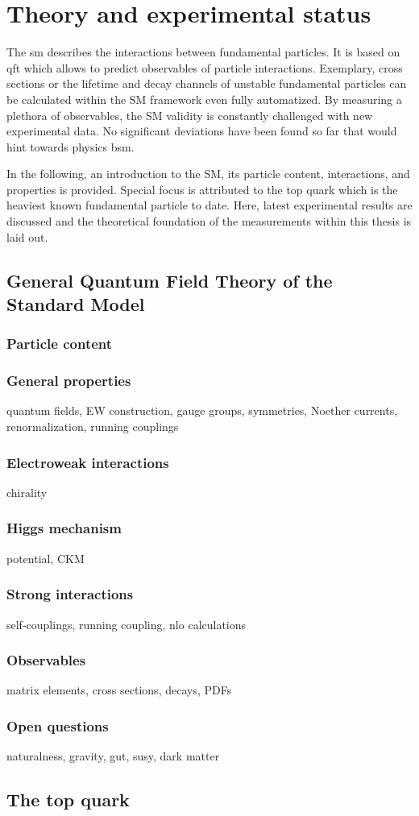 \chapter{Theory and experimental status}

The \gls{sm} describes the interactions between fundamental particles. It is based on \gls{qft} which allows to predict observables of particle interactions. Exemplary, cross sections or the lifetime and decay channels of unstable fundamental particles can be calculated within the SM framework even fully automatized. By measuring a plethora of observables, the SM validity is constantly challenged with new experimental data. No significant deviations have been found so far that would hint towards physics \gls{bsm}.

In the following, an introduction to the SM, its particle content, interactions, and properties is provided. Special focus is attributed to the top quark which is the heaviest known fundamental particle to date. Here, latest experimental results are discussed and the theoretical foundation of the measurements within this thesis is laid out.

\section{General Quantum Field Theory of the Standard Model}
\subsection{Particle content}
\subsection{General properties}
quantum fields, EW construction, gauge groups, symmetries, Noether currents, renormalization, running couplings
\subsection{Electroweak interactions}
chirality
\subsection{Higgs mechanism}
potential, CKM
\subsection{Strong interactions}
self-couplings, running coupling, nlo calculations
\subsection{Observables}
matrix elements, cross sections, decays, PDFs
\subsection{Open questions}
naturalness, gravity, gut, susy, dark matter

\section{The top quark}
\subsection{}
